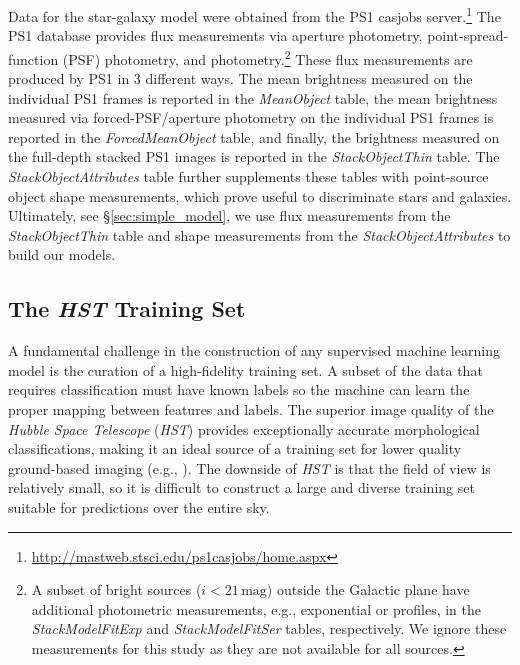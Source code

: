 \documentclass[twocolumn, dvipdfmx]{aastex62}
\begin{document}
Data for the star-galaxy model were obtained from the PS1 casjobs
server.\footnote{\url{http://mastweb.stsci.edu/ps1casjobs/home.aspx}} The PS1
database provides flux measurements via aperture photometry,
point-spread-function (PSF) photometry, and \citet{Kron80}
photometry.\footnote{A subset of bright sources ($i < 21\,\mathrm{mag}$)
outside the Galactic plane have additional photometric measurements, e.g.,
exponential or \citet{Sersic63} profiles, in the \textit{StackModelFitExp} and
\textit{StackModelFitSer} tables, respectively. We ignore these measurements
for this study as they are not available for all sources.} These flux
measurements are produced by PS1 in 3 different ways. The mean brightness
measured on the individual PS1 frames is reported in the \textit{MeanObject}
table, the mean brightness measured via forced-PSF/aperture photometry on the
individual PS1 frames is reported in the \textit{ForcedMeanObject} table, and
finally, the brightness measured on the full-depth stacked PS1 images is
reported in the \textit{StackObjectThin} table. The
\textit{StackObjectAttributes} table further supplements these tables with
point-source object shape measurements, which prove useful to discriminate
stars and galaxies. Ultimately, see \S\ref{sec:simple_model}, we use flux
measurements from the \textit{StackObjectThin} table and shape measurements
from the \textit{StackObjectAttributes} to build our models.

\subsection{The \textit{HST} Training Set} \label{sec:hst_train}

A fundamental challenge in the construction of any supervised machine learning
model is the curation of a high-fidelity training set. A subset of the data
that requires classification must have known labels so the machine can learn
the proper mapping between features and labels. The superior image quality of
the \textit{Hubble Space Telescope} (\textit{HST}) provides exceptionally
accurate morphological classifications, making it an ideal source of a training
set for lower quality ground-based imaging (e.g., \citealt{Lupton01}). The
downside of \textit{HST} is that the field of view is relatively small, so it
is difficult to construct a large and diverse training set suitable for
predictions over the entire sky.
\end{document}
